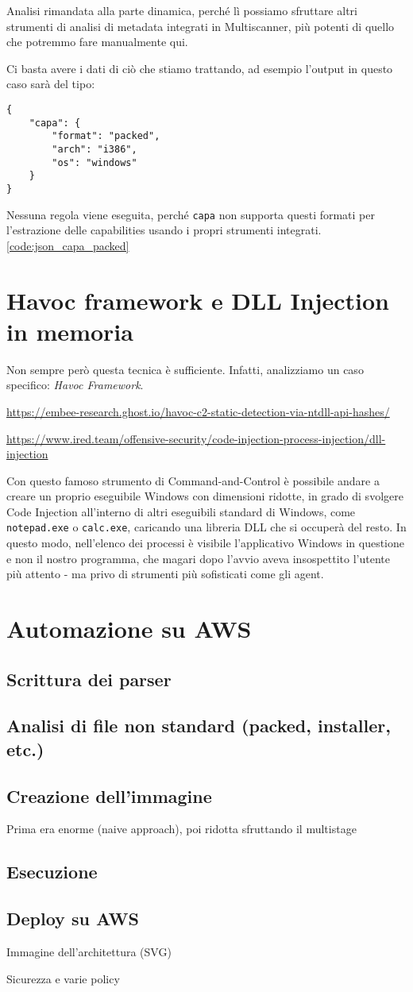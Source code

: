 Analisi rimandata alla parte dinamica, perché lì possiamo sfruttare altri strumenti di analisi di metadata integrati in Multiscanner, più potenti di quello che potremmo fare manualmente qui.

Ci basta avere i dati di ciò che stiamo trattando, ad esempio l'output in questo caso sarà del tipo:
\begin{code}
\label{code:json_capa_packed}
\begin{verbatim}
{
    "capa": {
        "format": "packed",
        "arch": "i386",
        "os": "windows"
    }
}
\end{verbatim}
\end{code}

Nessuna regola viene eseguita, perché \texttt{capa} non supporta questi formati per l'estrazione delle capabilities usando i propri strumenti integrati. \ref{code:json_capa_packed}

\section{Havoc framework e DLL Injection in memoria}
Non sempre però questa tecnica è sufficiente. Infatti, analizziamo un caso specifico: \emph{Havoc Framework}.

\url{https://embee-research.ghost.io/havoc-c2-static-detection-via-ntdll-api-hashes/}

\url{https://www.ired.team/offensive-security/code-injection-process-injection/dll-injection}

Con questo famoso strumento di Command-and-Control è possibile andare a creare un proprio eseguibile Windows con dimensioni ridotte, in grado di svolgere Code Injection all'interno di altri eseguibili standard di Windows, come \texttt{notepad.exe} o \texttt{calc.exe}, caricando una libreria DLL che si occuperà del resto. In questo modo, nell'elenco dei processi è visibile l'applicativo Windows in questione e non il nostro programma, che magari dopo l'avvio aveva insospettito l'utente più attento - ma privo di strumenti più sofisticati come gli agent.

\section{Automazione su AWS}
\subsection{Scrittura dei parser}
\subsection{Analisi di file non standard (packed, installer, etc.)}
\subsection{Creazione dell'immagine}
Prima era enorme (naive approach), poi ridotta sfruttando il multistage
\subsection{Esecuzione}
\subsection{Deploy su AWS}
Immagine dell'architettura (SVG)

Sicurezza e varie policy